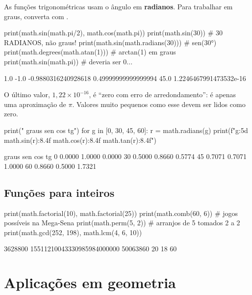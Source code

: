 As funções trigonométricas usam o ângulo em \textbf{radianos}. Para trabalhar em graus, converta com
.

\begin{entrada}
print(math.sin(math.pi/2), math.cos(math.pi))
print(math.sin(30))                     # 30 RADIANOS, não graus!
print(math.sin(math.radians(30)))       # sen(30°)
print(math.degrees(math.atan(1)))       # arctan(1) em graus
print(math.sin(math.pi))                # deveria ser 0...
\end{entrada}
\begin{saida}
1.0 -1.0
-0.9880316240928618
0.49999999999999994
45.0
1.2246467991473532e-16
\end{saida}

O último valor, $1{,}22\times10^{-16}$, é ``zero com erro de arredondamento'':  é apenas uma
aproximação de $\pi$. Valores muito pequenos como esse devem ser lidos como zero.

\begin{entrada}
print(" graus    sen      cos      tg")
for g in [0, 30, 45, 60]:
    r = math.radians(g)
    print(f"{g:5d} {math.sin(r):8.4f} {math.cos(r):8.4f} {math.tan(r):8.4f}")
\end{entrada}
\begin{saida}
 graus    sen      cos      tg
    0   0.0000   1.0000   0.0000
   30   0.5000   0.8660   0.5774
   45   0.7071   0.7071   1.0000
   60   0.8660   0.5000   1.7321
\end{saida}

\subsection{Funções para inteiros}

\begin{entrada}
print(math.factorial(10), math.factorial(25))
print(math.comb(60, 6))           # jogos possíveis na Mega-Sena
print(math.perm(5, 2))            # arranjos de 5 tomados 2 a 2
print(math.gcd(252, 198), math.lcm(4, 6, 10))
\end{entrada}
\begin{saida}
3628800 15511210043330985984000000
50063860
20
18 60
\end{saida}

\section{Aplicações em geometria}


